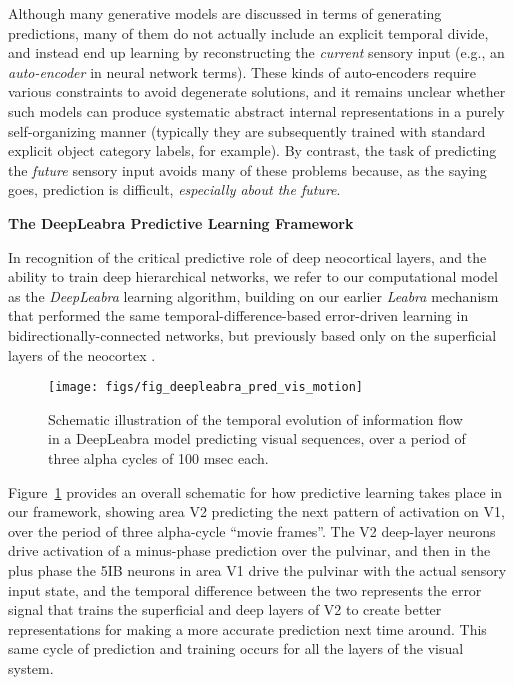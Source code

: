 \documentclass[10pt,twocolumn]{article}
\newif\myifpdf
\begin{document}
Although many generative models are discussed in terms of generating predictions, many of them do not actually include an explicit temporal divide, and instead end up learning by reconstructing the {\em current} sensory input (e.g., an {\em auto-encoder} in neural network terms).  These kinds of auto-encoders require various constraints to avoid degenerate solutions, and it remains unclear whether such models can produce systematic abstract internal representations in a purely self-organizing manner (typically they are subsequently trained with standard explicit object category labels, for example).  By contrast, the task of predicting the {\em future} sensory input avoids many of these problems because, as the saying goes, prediction is difficult, {\em especially about the future}.

\begin{center}
\textbf{The DeepLeabra Predictive Learning Framework}
\end{center}

In recognition of the critical predictive role of deep neocortical layers, and the ability to train deep hierarchical networks, we refer to our computational model as the {\em DeepLeabra} learning algorithm, building on our earlier {\em Leabra} mechanism that performed the same temporal-difference-based error-driven learning in bidirectionally-connected networks, but previously based only on the superficial layers of the neocortex \cite{OReillyHazyHerd16,OReillyMunakataFrankEtAl12,OReillyMunakata00,OReilly96}.

\begin{figure}
  \centering\texttt{[image: figs/fig\_deepleabra\_pred\_vis\_motion]}
  \caption{Schematic illustration of the temporal evolution of information flow in a DeepLeabra model predicting visual sequences, over a period of three alpha cycles of 100 msec each.}
  \label{fig.pred_vis_motion}
\end{figure}

Figure~\ref{fig.pred_vis_motion} provides an overall schematic for how predictive learning takes place in our framework, showing area V2 predicting the next pattern of activation on V1, over the period of three alpha-cycle ``movie frames''.  The V2 deep-layer neurons drive activation of a minus-phase prediction over the pulvinar, and then in the plus phase the 5IB neurons in area V1 drive the pulvinar with the actual sensory input state, and the temporal difference between the two represents the error signal that trains the superficial and deep layers of V2 to create better representations for making a more accurate prediction next time around. This same cycle of prediction and training occurs for all the layers of the visual system. 
\end{document}

